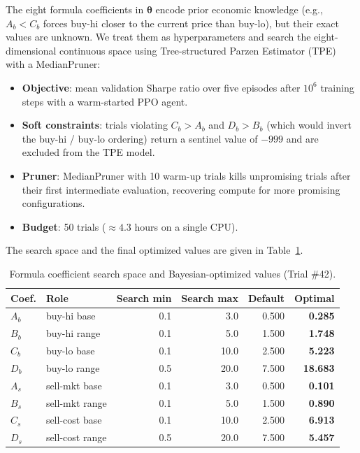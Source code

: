 \documentclass[11pt, a4paper]{article}
\begin{document}
The eight formula coefficients in $\bm{\theta}$ encode prior economic knowledge
(e.g., $A_b < C_b$ forces buy-hi closer to the current price than buy-lo), but
their exact values are unknown.
We treat them as hyperparameters and search the eight-dimensional continuous space
using Tree-structured Parzen Estimator (TPE) with a MedianPruner:

\begin{itemize}
    \item \textbf{Objective}: mean validation Sharpe ratio over five episodes
          after $10^6$ training steps with a warm-started PPO agent.
    \item \textbf{Soft constraints}: trials violating $C_b > A_b$ and $D_b > B_b$
          (which would invert the buy-hi / buy-lo ordering) return a sentinel value
          of $-999$ and are excluded from the TPE model.
    \item \textbf{Pruner}: MedianPruner with 10 warm-up trials kills unpromising
          trials after their first intermediate evaluation, recovering compute for
          more promising configurations.
    \item \textbf{Budget}: 50 trials ($\approx 4.3$ hours on a single CPU).
\end{itemize}

The search space and the final optimized values are given in
Table~\ref{tab:coefs}.

\begin{table}[h]
\centering
\caption{Formula coefficient search space and Bayesian-optimized values (Trial \#42).}
\label{tab:coefs}
\setlength{\tabcolsep}{6pt}
\begin{tabular}{llrrrr}
\toprule
Coef. & Role & Search min & Search max & \textbf{Default} & \textbf{Optimal} \\
\midrule
$A_b$ & buy-hi base & 0.1 & 3.0 & 0.500 & \textbf{0.285} \\
$B_b$ & buy-hi range & 0.1 & 5.0 & 1.500 & \textbf{1.748} \\
$C_b$ & buy-lo base & 0.1 & 10.0 & 2.500 & \textbf{5.223} \\
$D_b$ & buy-lo range & 0.5 & 20.0 & 7.500 & \textbf{18.683} \\
$A_s$ & sell-mkt base & 0.1 & 3.0 & 0.500 & \textbf{0.101} \\
$B_s$ & sell-mkt range & 0.1 & 5.0 & 1.500 & \textbf{0.890} \\
$C_s$ & sell-cost base & 0.1 & 10.0 & 2.500 & \textbf{6.913} \\
$D_s$ & sell-cost range & 0.5 & 20.0 & 7.500 & \textbf{5.457} \\
\bottomrule
\end{tabular}
\end{table}
\end{document}
